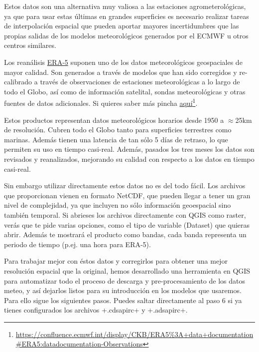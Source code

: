 \documentclass[a4paper,11pt]{article}
\begin{document}
Estos datos son una alternativa muy valiosa a las estaciones agrometerológicas, ya que para usar estas últimas en grandes superficies es necesario realizar tareas de interpolación espacial que pueden aportar mayores incertidumbres que las propias salidas de los modelos meteorológicos generados por el ECMWF u otros centros similares. 

Los reanálisis \href{https://cds.climate.copernicus.eu/cdsapp#!/dataset/reanalysis-era5-single-levels}{ERA-5} suponen uno de los datos meteorológicos geospaciales de mayor calidad. Son generados a través de modelos que han sido corregidos y re-calibrado a través de observaciones de estaciones meteorológicas a lo largo de todo el Globo, así como de información satelital, sondas meteorológicas y otras fuentes de datos adicionales. Si quieres saber más pincha \href{https://confluence.ecmwf.int/display/CKB/ERA5\%3A+data+documentation#ERA5:datadocumentation-Observations}{aquí}\footnote{\url{https://confluence.ecmwf.int/display/CKB/ERA5\%3A+data+documentation#ERA5:datadocumentation-Observations}}.

Estos productos representan datos meteorológicos horarios desde 1950 a $\approx$25km de resolución. Cubren todo el Globo tanto para superficies terrestres como marinas. Además tienen una latencia de tan sólo 5 días de retraso, lo que permiten su uso en tiempo casi-real. Además, pasados los tres meses los datos son revisados y reanalizados, mejorando su calidad con respecto a los datos en tiempo casi-real.

Sin embargo utilizar directamente estos datos no es del todo fácil. Los archivos que proporcionan vienen en formato NetCDF, que pueden llegar a tener un gran nivel de complejidad, ya que incluyen no sólo información geoespacial sino también temporal. Si abrieses los archivos directamente con QGIS como raster, verás que te pide varias opciones, como el tipo de variable (Dataset) que quieras abrir. Además te mostrará el producto como bandas, cada banda representa un periodo de tiempo (p.ej. una hora para ERA-5). 

Para trabajar mejor con éstos datos y corregirlos para obtener una mejor resolución espacial que la original, hemos desarrollado una herramienta en QGIS para automatizar todo el proceso de descarga y pre-procesamiento de los datos meteo, y así dejarlos listos para su introducción en los modelos que usaremos. Para ello sigue los siguientes pasos. Puedes saltar directamente al paso 6 si ya tienes configurados los archivos \cverb+.cdsapirc+ y \cverb+.adsapirc+.
\end{document}
